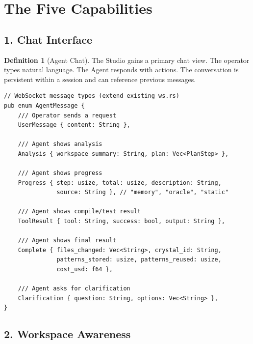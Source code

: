 \documentclass[11pt,a4paper,twoside]{article}
\theoremstyle{definition}
\newtheorem{definition}{Definition}[section]
\theoremstyle{remark}
\begin{document}
\section{The Five Capabilities}\label{sec:capabilities}

\subsection{1. Chat Interface}\label{sec:chat}

\begin{definition}[Agent Chat]\label{def:chat}
The Studio gains a primary chat view. The operator types natural
language. The Agent responds with actions. The conversation is
persistent within a session and can reference previous messages.

\begin{lstlisting}
// WebSocket message types (extend existing ws.rs)
pub enum AgentMessage {
    /// Operator sends a request
    UserMessage { content: String },

    /// Agent shows analysis
    Analysis { workspace_summary: String, plan: Vec<PlanStep> },

    /// Agent shows progress
    Progress { step: usize, total: usize, description: String,
               source: String }, // "memory", "oracle", "static"

    /// Agent shows compile/test result
    ToolResult { tool: String, success: bool, output: String },

    /// Agent shows final result
    Complete { files_changed: Vec<String>, crystal_id: String,
               patterns_stored: usize, patterns_reused: usize,
               cost_usd: f64 },

    /// Agent asks for clarification
    Clarification { question: String, options: Vec<String> },
}
\end{lstlisting}
\end{definition}


\subsection{2. Workspace Awareness}\label{sec:workspace}
\end{document}
